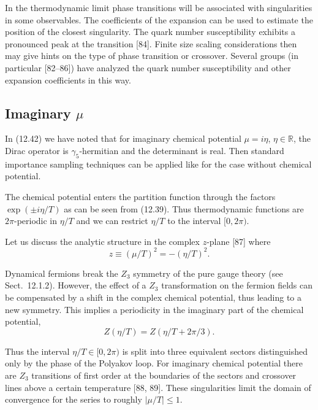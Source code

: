 In the thermodynamic limit phase transitions will be associated with
singularities in some observables. The coefficients of the expansion can be
used to estimate the position of the closest singularity. The quark number
susceptibility exhibits a pronounced peak at the transition [84]. Finite size
scaling considerations then may give hints on the type of phase transition or
crossover. Several groups (in particular [82--86]) have analyzed the quark
number susceptibility and other expansion coefficients in this way.

\subsection{Imaginary $\mu$}

In (12.42) we have noted that for imaginary chemical potential $\mu = i\eta$,
$\eta \in \mathbb{R}$, the Dirac operator is $\gamma_5$-hermitian and the
determinant is real. Then standard importance sampling techniques can be
applied like for the case without chemical potential.

The chemical potential enters the partition function through the factors
$\exp(\pm i\eta/T)$ as can be seen from (12.39). Thus thermodynamic functions
are $2\pi$-periodic in $\eta/T$ and we can restrict $\eta/T$ to the interval
$[0, 2\pi)$.

Let us discuss the analytic structure in the complex $z$-plane [87] where
\begin{equation}
  z \equiv (\mu/T)^2 = -(\eta/T)^2 .
\end{equation}

Dynamical fermions break the $Z_3$ symmetry of the pure gauge theory (see
Sect.~12.1.2). However, the effect of a $Z_3$ transformation on the fermion
fields can be compensated by a shift in the complex chemical potential, thus
leading to a new symmetry. This implies a periodicity in the imaginary part of
the chemical potential,
\begin{equation}
  Z(\eta/T) = Z(\eta/T + 2\pi/3) .
\end{equation}

Thus the interval $\eta/T \in [0, 2\pi)$ is split into three equivalent sectors
distinguished only by the phase of the Polyakov loop. For imaginary chemical
potential there are $Z_3$ transitions of first order at the boundaries of the
sectors and crossover lines above a certain temperature [88, 89]. These
singularities limit the domain of convergence for the series to roughly
$|\mu/T| \le 1$.

